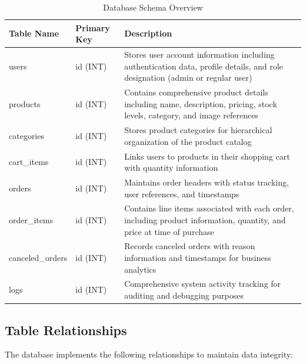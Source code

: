 \documentclass[14pt,a4paper]{article}
\begin{document}
\begin{table}[H]
	\centering
	\caption{Database Schema Overview}
	\label{tab:schema}
	\begin{tabularx}{\textwidth}{|l|l|X|}
		\hline
		\textbf{Table Name} & \textbf{Primary Key} & \textbf{Description}                                                                                                         \\
		\hline
		users               & id (INT)             & Stores user account information including authentication data, profile details, and role designation (admin or regular user) \\
		\hline
		products            & id (INT)             & Contains comprehensive product details including name, description, pricing, stock levels, category, and image references    \\
		\hline
		categories          & id (INT)             & Stores product categories for hierarchical organization of the product catalog                                               \\
		\hline
		cart\_items         & id (INT)             & Links users to products in their shopping cart with quantity information                                                     \\
		\hline
		orders              & id (INT)             & Maintains order headers with status tracking, user references, and timestamps                                                \\
		\hline
		order\_items        & id (INT)             & Contains line items associated with each order, including product information, quantity, and price at time of purchase       \\
		\hline
		canceled\_orders    & id (INT)             & Records canceled orders with reason information and timestamps for business analytics                                        \\
		\hline
		logs                & id (INT)             & Comprehensive system activity tracking for auditing and debugging purposes                                                   \\
		\hline
	\end{tabularx}
\end{table}

\subsection{Table Relationships}
The database implements the following relationships to maintain data integrity:
\end{document}
